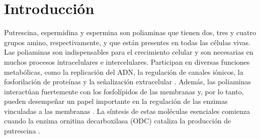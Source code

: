 



\section{Introducci\'on}

Putrescina, espermidina y espermina son poliaminas que tienen dos, tres y cuatro grupos amino, respectivamente, y que est\'an presentes en todas las c\'elulas vivas.
Las poliaminas son indispensables para el crecimiento celular y son necesarias en muchos procesos intracelulares e intercelulares.
Participan en diversas funciones metab\'olicas, como la replicaci\'on del ADN, la regulaci\'on de canales i\'onicos, la fosforilaci\'on de prote\'inas y la se\~nalizaci\'on extracelular .
Adem\'as, las poliaminas interact\'uan fuertemente con los fosfol\'ipidos de las membranas y, por lo tanto, pueden desempe\~nar un papel importante en la regulaci\'on de las enzimas vinculadas a las membranas \addcite[Moinard2005].
La s\'intesis de estas mol\'eculas esenciales comienza cuando la enzima ornitina decarboxilasa (ODC) cataliza la producción de putrescina .

